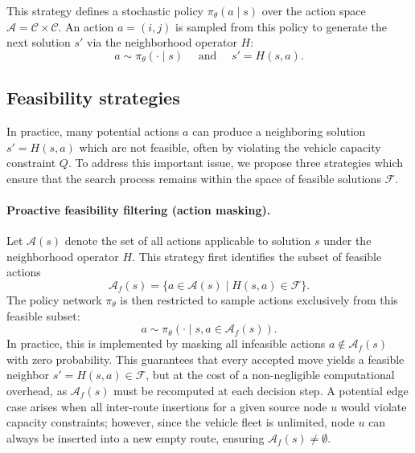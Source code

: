 \documentclass[letterpaper]{article} %
\begin{document}
This strategy defines a stochastic policy $\pi_\theta(a \mid s)$ over the action space $\mathcal{A} = \mathcal{C} \times \mathcal{C}$. An action $a = (i, j)$ is sampled from this policy to generate the next solution $s'$ via the neighborhood operator $H$:
\begin{equation}
    a \sim \pi_\theta(\cdot \mid s) \quad \text{ and } \quad s' = H(s, a). \label{eq:nhood_selection}
\end{equation}

\subsection{Feasibility strategies}


In practice, many potential actions $a$ can produce a neighboring solution $s' = H(s, a)$ which are not feasible, often by violating the vehicle capacity constraint $Q$. To address this important issue, we propose three strategies which ensure that the search process remains within the space of feasible solutions $\mathcal{F}$.

\paragraph{Proactive feasibility filtering (action masking).} 
Let $\mathcal{A}(s)$ denote the set of all actions applicable to solution $s$ under the neighborhood operator $H$.
This strategy first identifies the subset of feasible actions
\begin{equation*}
\mathcal{A}_f(s) = \{ a \in \mathcal{A}(s) \mid H(s, a) \in \mathcal{F} \}.
\end{equation*}
The policy network $\pi_\theta$ is then restricted to sample actions exclusively from this feasible subset:
\begin{equation*}
a \sim \pi_\theta(\cdot \mid s, a \in \mathcal{A}_f(s)).
\end{equation*}
In practice, this is implemented by masking all infeasible actions $a \notin \mathcal{A}_f(s)$ with zero probability. This guarantees that every accepted move yields a feasible neighbor $s' = H(s, a) \in \mathcal{F}$, but at the cost of a non-negligible computational overhead, as $\mathcal{A}_f(s)$ must be recomputed at each decision step. A potential edge case arises when all inter-route insertions for a given source node $u$ would violate capacity constraints; however, since the vehicle fleet is unlimited, node $u$ can always be inserted into a new empty route, ensuring $\mathcal{A}_f(s) \neq \emptyset$.
\end{document}
